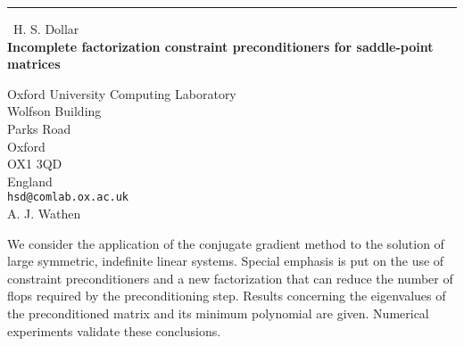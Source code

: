 \documentclass{report}
\begin{document}
\begin{center}
\rule{6in}{1pt} \
{\large H. S. Dollar \\
{\bf Incomplete factorization constraint preconditioners for saddle-point matrices}}

Oxford University Computing Laboratory \\ Wolfson Building \\ Parks Road \\ Oxford \\ OX1 3QD \\ England
\\
{\tt hsd@comlab.ox.ac.uk}\\
A. J.  Wathen\end{center}

We consider the application of the conjugate gradient method to
the solution of large symmetric, indefinite linear systems.
Special emphasis is put on the use of constraint preconditioners
and a new factorization that can reduce the number of flops
required by the preconditioning step. Results concerning the
eigenvalues of the preconditioned matrix and its minimum
polynomial are given. Numerical experiments validate these
conclusions.
\end{document}
